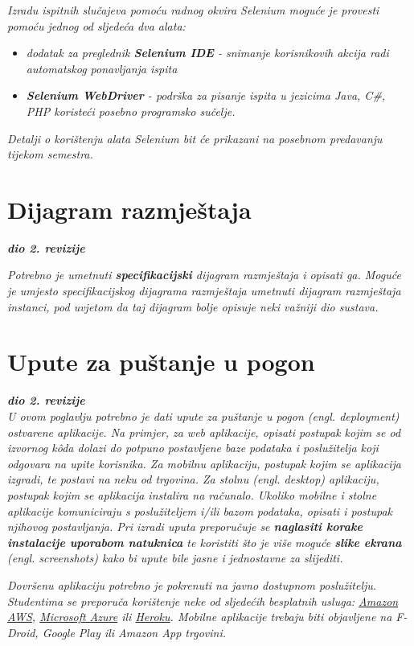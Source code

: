 			 \textit{Izradu ispitnih slučajeva pomoću radnog okvira Selenium moguće je provesti pomoću jednog od sljedeća dva alata:}
			 \begin{itemize}
			 	\item \textit{dodatak za preglednik \textbf{Selenium IDE} - snimanje korisnikovih akcija radi automatskog ponavljanja ispita	}
			 	\item \textit{\textbf{Selenium WebDriver} - podrška za pisanje ispita u jezicima Java, C\#, PHP koristeći posebno programsko sučelje.}
			 \end{itemize}
		 	\textit{Detalji o korištenju alata Selenium bit će prikazani na posebnom predavanju tijekom semestra.}
			
			\eject 
		
		
		\section{Dijagram razmještaja}
			
			\textbf{\textit{dio 2. revizije}}
			
			 \textit{Potrebno je umetnuti \textbf{specifikacijski} dijagram razmještaja i opisati ga. Moguće je umjesto specifikacijskog dijagrama razmještaja umetnuti dijagram razmještaja instanci, pod uvjetom da taj dijagram bolje opisuje neki važniji dio sustava.}
			
			\eject 
		
		\section{Upute za puštanje u pogon}
		
			\textbf{\textit{dio 2. revizije}}\\
		
			 \textit{U ovom poglavlju potrebno je dati upute za puštanje u pogon (engl. deployment) ostvarene aplikacije. Na primjer, za web aplikacije, opisati postupak kojim se od izvornog kôda dolazi do potpuno postavljene baze podataka i poslužitelja koji odgovara na upite korisnika. Za mobilnu aplikaciju, postupak kojim se aplikacija izgradi, te postavi na neku od trgovina. Za stolnu (engl. desktop) aplikaciju, postupak kojim se aplikacija instalira na računalo. Ukoliko mobilne i stolne aplikacije komuniciraju s poslužiteljem i/ili bazom podataka, opisati i postupak njihovog postavljanja. Pri izradi uputa preporučuje se \textbf{naglasiti korake instalacije uporabom natuknica} te koristiti što je više moguće \textbf{slike ekrana} (engl. screenshots) kako bi upute bile jasne i jednostavne za slijediti.}
			
			
			 \textit{Dovršenu aplikaciju potrebno je pokrenuti na javno dostupnom poslužitelju. Studentima se preporuča korištenje neke od sljedećih besplatnih usluga: \href{https://aws.amazon.com/}{Amazon AWS}, \href{https://azure.microsoft.com/en-us/}{Microsoft Azure} ili \href{https://www.heroku.com/}{Heroku}. Mobilne aplikacije trebaju biti objavljene na F-Droid, Google Play ili Amazon App trgovini.}
			
			
			\eject 